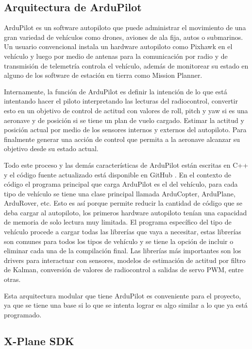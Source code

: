 \subsection{Arquitectura de ArduPilot}

ArduPilot es un software autopiloto que puede administrar el movimiento de una gran variedad de vehículos como drones, aviones de ala fija, autos o submarinos. Un usuario convencional instala un hardware autopiloto como Pixhawk en el vehículo y luego por medio de antenas para la comunicación por radio y de transmisión de telemetría controla el vehículo, además de monitorear su estado en alguno de los software de estación en tierra como Mission Planner.

Internamente, la función de ArduPilot es definir la intención de lo que está intentando hacer el piloto interpretando las lecturas del radiocontrol, convertir esto en un objetivo de control de actitud con valores de roll, pitch y yaw si es una aeronave y de posición si se tiene un plan de vuelo cargado. Estimar la actitud y posición actual por medio de los sensores internos y externos del autopiloto. Para finalmente generar una acción de control que permita a la aeronave alcanzar su objetivo desde su estado actual.

Todo este proceso y las demás características de ArduPilot están escritas en C++ y el código fuente actualizado está disponible en GitHub \cite{ap-github-repo}. En el contexto de código el programa principal que carga ArduPilot es el del vehículo, para cada tipo de vehículo se tiene una clase principal llamada ArduCopter, ArduPlane, ArduRover, etc. Esto es así porque permite reducir la cantidad de código que se deba cargar al autopiloto, los primeros hardware autopiloto tenían una capacidad de memoria de solo lectura muy limitada. El programa específico del tipo de vehículo procede a cargar todas las librerías que vaya a necesitar, estas librerías son comunes para todos los tipos de vehículo y se tiene la opción de incluir o eliminar cada una de la compilación final. Las librerías más importantes son los drivers para interactuar con sensores, modelos de estimación de actitud por filtro de Kalman, conversión de valores de radiocontrol a salidas de servo PWM, entre otras.

Esta arquitectura modular que tiene ArduPilot es conveniente para el proyecto, ya que se tiene una base si lo que se intenta lograr es algo similar a lo que ya está programado.

\subsection{X-Plane SDK}

